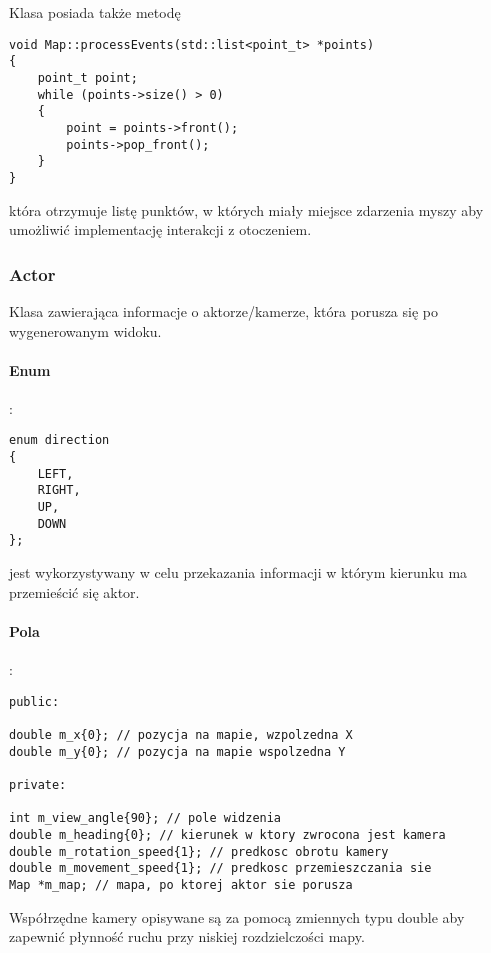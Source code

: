 \documentclass[11pt, a4paper]{article}
\begin{document}
Klasa posiada także metodę
\begin{lstlisting}
void Map::processEvents(std::list<point_t> *points)
{
    point_t point;
    while (points->size() > 0)
    {
        point = points->front();
        points->pop_front();
    }
}
\end{lstlisting}
która otrzymuje listę punktów, w których miały miejsce zdarzenia myszy aby umożliwić implementację interakcji z otoczeniem. 

\subsubsection{Actor}
Klasa zawierająca informacje o aktorze/kamerze, która porusza się po wygenerowanym widoku.
\paragraph{Enum}:
\begin{lstlisting}
enum direction
{
    LEFT,
    RIGHT,
    UP,
    DOWN
};
\end{lstlisting}
jest wykorzystywany w celu przekazania informacji w którym kierunku ma przemieścić się aktor.
\paragraph{Pola}: 
\begin{lstlisting}
public:

double m_x{0}; // pozycja na mapie, wzpolzedna X
double m_y{0}; // pozycja na mapie wspolzedna Y

private:

int m_view_angle{90}; // pole widzenia
double m_heading{0}; // kierunek w ktory zwrocona jest kamera
double m_rotation_speed{1}; // predkosc obrotu kamery
double m_movement_speed{1}; // predkosc przemieszczania sie
Map *m_map; // mapa, po ktorej aktor sie porusza
\end{lstlisting}
Współrzędne kamery opisywane są za pomocą zmiennych typu double aby zapewnić płynność ruchu przy niskiej rozdzielczości mapy.
\end{document}
